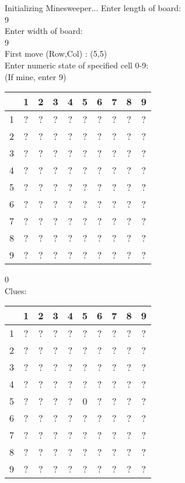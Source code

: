
Initializing Minesweeper...
Enter length of board: \\
9\\
Enter width of board: \\
9\\
First move (Row,Col) : (5,5)\\
Enter numeric state of specified cell 0-9: \\
(If mine, enter 9)\\
\begin{tabular}{|c|c|c|c|c|c|c|c|c|c|}
\hline
  & 1 & 2 & 3 & 4 & 5 & 6 & 7 & 8 & 9\\
\hline
1 & ? & ? & ? & ? & ? & ? & ? & ? & ?\\
\hline
2 & ? & ? & ? & ? & ? & ? & ? & ? & ?\\
\hline
3 & ? & ? & ? & ? & ? & ? & ? & ? & ?\\
\hline
4 & ? & ? & ? & ? & ? & ? & ? & ? & ?\\
\hline
5 & ? & ? & ? & ? & ? & ? & ? & ? & ?\\
\hline
6 & ? & ? & ? & ? & ? & ? & ? & ? & ?\\
\hline
7 & ? & ? & ? & ? & ? & ? & ? & ? & ?\\
\hline
8 & ? & ? & ? & ? & ? & ? & ? & ? & ?\\
\hline
9 & ? & ? & ? & ? & ? & ? & ? & ? & ?\\
\hline
\end{tabular}

0\\
Clues:\\
\begin{tabular}{|c|c|c|c|c|c|c|c|c|c|}
\hline
  & 1 & 2 & 3 & 4 & 5 & 6 & 7 & 8 & 9\\
\hline
1 & ? & ? & ? & ? & ? & ? & ? & ? & ?\\
\hline
2 & ? & ? & ? & ? & ? & ? & ? & ? & ?\\
\hline
3 & ? & ? & ? & ? & ? & ? & ? & ? & ?\\
\hline
4 & ? & ? & ? & ? & ? & ? & ? & ? & ?\\
\hline
5 & ? & ? & ? & ? & 0 & ? & ? & ? & ?\\
\hline
6 & ? & ? & ? & ? & ? & ? & ? & ? & ?\\
\hline
7 & ? & ? & ? & ? & ? & ? & ? & ? & ?\\
\hline
8 & ? & ? & ? & ? & ? & ? & ? & ? & ?\\
\hline
9 & ? & ? & ? & ? & ? & ? & ? & ? & ?\\
\hline
\end{tabular}

